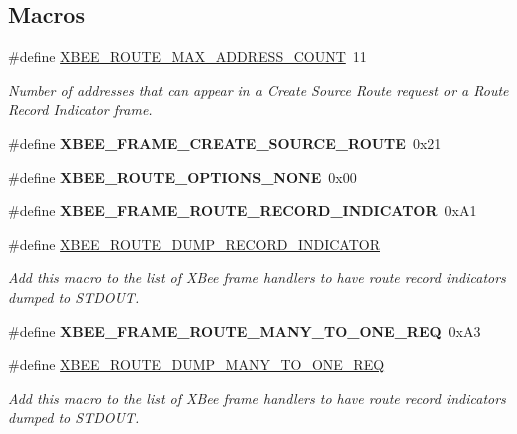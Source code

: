 \subsection*{Macros}
\begin{DoxyCompactItemize}
\item 
\#define \hyperlink{group__xbee__route_ga41b7c2f8ef5f6e4912572871790611d2}{X\+B\+E\+E\+\_\+\+R\+O\+U\+T\+E\+\_\+\+M\+A\+X\+\_\+\+A\+D\+D\+R\+E\+S\+S\+\_\+\+C\+O\+U\+NT}~11
\begin{DoxyCompactList}\small\item\em Number of addresses that can appear in a Create Source Route request or a Route Record Indicator frame. \end{DoxyCompactList}\item 
\mbox{\label{group__xbee__route_ga02ffd9f293667654c35729ed10f8fd9e}} 
\#define {\bfseries X\+B\+E\+E\+\_\+\+F\+R\+A\+M\+E\+\_\+\+C\+R\+E\+A\+T\+E\+\_\+\+S\+O\+U\+R\+C\+E\+\_\+\+R\+O\+U\+TE}~0x21
\item 
\mbox{\label{group__xbee__route_ga81c8e8cbc36d6ba3448196796f442ac7}} 
\#define {\bfseries X\+B\+E\+E\+\_\+\+R\+O\+U\+T\+E\+\_\+\+O\+P\+T\+I\+O\+N\+S\+\_\+\+N\+O\+NE}~0x00
\item 
\mbox{\label{group__xbee__route_ga0167412988c6533938c3a0f9db200054}} 
\#define {\bfseries X\+B\+E\+E\+\_\+\+F\+R\+A\+M\+E\+\_\+\+R\+O\+U\+T\+E\+\_\+\+R\+E\+C\+O\+R\+D\+\_\+\+I\+N\+D\+I\+C\+A\+T\+OR}~0x\+A1
\item 
\#define \hyperlink{group__xbee__route_ga47ed8d34bae2282e8397becffbe212fb}{X\+B\+E\+E\+\_\+\+R\+O\+U\+T\+E\+\_\+\+D\+U\+M\+P\+\_\+\+R\+E\+C\+O\+R\+D\+\_\+\+I\+N\+D\+I\+C\+A\+T\+OR}
\begin{DoxyCompactList}\small\item\em Add this macro to the list of X\+Bee frame handlers to have route record indicators dumped to S\+T\+D\+O\+UT. \end{DoxyCompactList}\item 
\mbox{\label{group__xbee__route_ga7769894d4361b0c0f2025f0a6bee70ae}} 
\#define {\bfseries X\+B\+E\+E\+\_\+\+F\+R\+A\+M\+E\+\_\+\+R\+O\+U\+T\+E\+\_\+\+M\+A\+N\+Y\+\_\+\+T\+O\+\_\+\+O\+N\+E\+\_\+\+R\+EQ}~0x\+A3
\item 
\#define \hyperlink{group__xbee__route_gab9293f39692e0bc50896eed12ef89d4e}{X\+B\+E\+E\+\_\+\+R\+O\+U\+T\+E\+\_\+\+D\+U\+M\+P\+\_\+\+M\+A\+N\+Y\+\_\+\+T\+O\+\_\+\+O\+N\+E\+\_\+\+R\+EQ}
\begin{DoxyCompactList}\small\item\em Add this macro to the list of X\+Bee frame handlers to have route record indicators dumped to S\+T\+D\+O\+UT. \end{DoxyCompactList}\end{DoxyCompactItemize}
